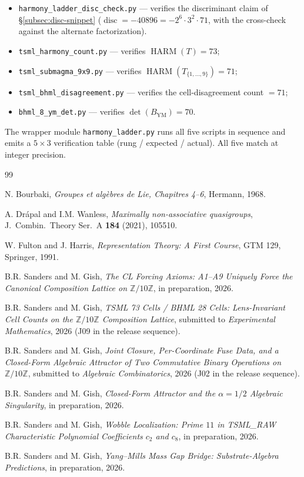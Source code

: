 \documentclass[11pt,reqno]{amsart}
\theoremstyle{definition}
\newcommand{\Z}{\mathbb{Z}}
\DeclareMathOperator{\HARM}{HARM}
\DeclareMathOperator{\disc}{disc}
\begin{document}
\begin{itemize}[leftmargin=*]
\item \texttt{harmony\_ladder\_disc\_check.py} — verifies the
discriminant claim of §\ref{subsec:disc-snippet} ($\disc = -40896 =
-2^6 \cdot 3^2 \cdot 71$, with the cross-check against the alternate
factorization).
\item \texttt{tsml\_harmony\_count.py} — verifies $\HARM(T) = 73$;
\item \texttt{tsml\_submagma\_9x9.py} — verifies $\HARM(T_{\{1,\ldots,9\}}) = 71$;
\item \texttt{tsml\_bhml\_disagreement.py} — verifies the cell-disagreement count $= 71$;
\item \texttt{bhml\_8\_ym\_det.py} — verifies $\det(B_{\mathrm{YM}}) = 70$.
\end{itemize}

The wrapper module \texttt{harmony\_ladder.py} runs all five scripts
in sequence and emits a $5 \times 3$ verification table
(rung / expected / actual). All five match at integer precision.

\begin{thebibliography}{99}

N. Bourbaki, \emph{Groupes et alg\`ebres de Lie, Chapitres 4--6},
Hermann, 1968.

A. Drápal and I.M. Wanless, \emph{Maximally non-associative
quasigroups}, J.~Combin.~Theory Ser.~A \textbf{184} (2021), 105510.

W. Fulton and J. Harris, \emph{Representation Theory: A First
Course}, GTM 129, Springer, 1991.

B.R. Sanders and M. Gish, \emph{The CL Forcing Axioms: A1--A9
Uniquely Force the Canonical Composition Lattice on $\Z/10\Z$},
in preparation, 2026.

B.R. Sanders and M. Gish, \emph{TSML 73 Cells / BHML 28 Cells:
Lens-Invariant Cell Counts on the $\Z/10\Z$ Composition Lattice},
submitted to \emph{Experimental Mathematics}, 2026 (J09 in the
release sequence).

B.R. Sanders and M. Gish, \emph{Joint Closure, Per-Coordinate Fuse
Data, and a Closed-Form Algebraic Attractor of Two Commutative
Binary Operations on $\Z/10\Z$}, submitted to \emph{Algebraic
Combinatorics}, 2026 (J02 in the release sequence).

B.R. Sanders and M. Gish, \emph{Closed-Form Attractor and the
$\alpha = 1/2$ Algebraic Singularity}, in preparation, 2026.

B.R. Sanders and M. Gish, \emph{Wobble Localization: Prime $11$ in
TSML\_RAW Characteristic Polynomial Coefficients $c_2$ and $c_8$},
in preparation, 2026.

B.R. Sanders and M. Gish, \emph{Yang--Mills Mass Gap Bridge:
Substrate-Algebra Predictions}, in preparation, 2026.

\end{thebibliography}
\end{document}
